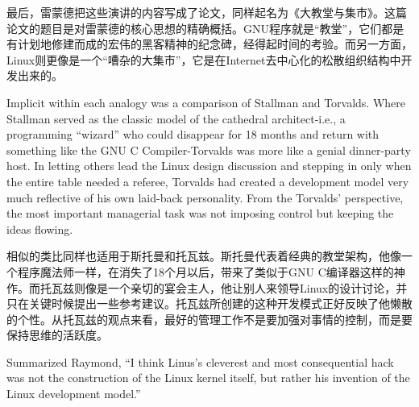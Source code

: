 \ifdefined\chs
最后，雷蒙德把这些演讲的内容写成了论文，同样起名为《大教堂与集市》。这篇论文的题目是对雷蒙德的核心思想的精确概括。GNU程序就是``教堂''，它们都是有计划地修建而成的宏伟的黑客精神的纪念碑，经得起时间的考验。而另一方面，Linux则更像是一个``嘈杂的大集市''，它是在Internet去中心化的松散组织结构中开发出来的。
\fi



\ifdefined\eng
Implicit within each analogy was a comparison of Stallman and Torvalds. Where Stallman served as the classic model of the cathedral architect-i.e., a programming ``wizard'' who could disappear for 18 months and return with something like the GNU C Compiler-Torvalds was more like a genial dinner-party host. In letting others lead the Linux design discussion and stepping in only when the entire table needed a referee, Torvalds had created a development model very much reflective of his own laid-back personality. From the Torvalds' perspective, the most important managerial task was not imposing control but keeping the ideas flowing.
\fi

\ifdefined\chs
相似的类比同样也适用于斯托曼和托瓦兹。斯托曼代表着经典的教堂架构，他像一个程序魔法师一样，在消失了18个月以后，带来了类似于GNU C编译器这样的神作。而托瓦兹则像是一个亲切的宴会主人，他让别人来领导Linux的设计讨论，并只在关键时候提出一些参考建议。托瓦兹所创建的这种开发模式正好反映了他懒散的个性。从托瓦兹的观点来看，最好的管理工作不是要加强对事情的控制，而是要保持思维的活跃度。
\fi

\ifdefined\eng
Summarized Raymond, ``I think Linus's cleverest and most consequential hack was not the construction of the Linux kernel itself, but rather his invention of the Linux development model.''
\fi

